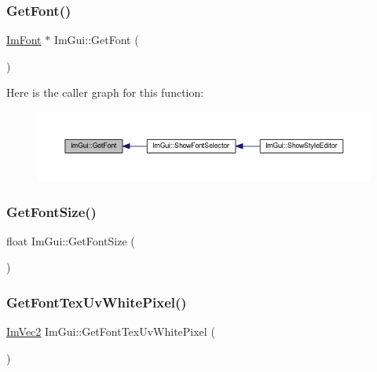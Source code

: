 \mbox{\label{namespace_im_gui_a43cf349576e20fac4a1300269320ad8f}} 
\subsubsection{\texorpdfstring{Get\+Font()}{GetFont()}}
{\footnotesize\ttfamily \mbox{\hyperlink{struct_im_font}{Im\+Font}} $\ast$ Im\+Gui\+::\+Get\+Font (\begin{DoxyParamCaption}{ }\end{DoxyParamCaption})}

Here is the caller graph for this function\+:
\nopagebreak
\begin{figure}[H]
\begin{center}
\leavevmode
\includegraphics[width=350pt]{namespace_im_gui_a43cf349576e20fac4a1300269320ad8f_icgraph}
\end{center}
\end{figure}
\mbox{\label{namespace_im_gui_ac592ae8e0aa4a1a06502ec7872bc8da8}} 
\subsubsection{\texorpdfstring{Get\+Font\+Size()}{GetFontSize()}}
{\footnotesize\ttfamily float Im\+Gui\+::\+Get\+Font\+Size (\begin{DoxyParamCaption}{ }\end{DoxyParamCaption})}

\mbox{\label{namespace_im_gui_a3092da6abc1d04f3287c084435dc6026}} 
\subsubsection{\texorpdfstring{Get\+Font\+Tex\+Uv\+White\+Pixel()}{GetFontTexUvWhitePixel()}}
{\footnotesize\ttfamily \mbox{\hyperlink{struct_im_vec2}{Im\+Vec2}} Im\+Gui\+::\+Get\+Font\+Tex\+Uv\+White\+Pixel (\begin{DoxyParamCaption}{ }\end{DoxyParamCaption})}

